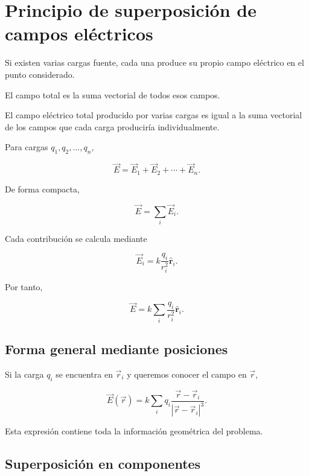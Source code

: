 \section{Principio de superposición de campos eléctricos}

Si existen varias cargas fuente, cada una produce su propio campo eléctrico en el
punto considerado.

El campo total es la suma vectorial de todos esos campos.

\begin{principio}

El campo eléctrico total producido por varias cargas es igual a la suma vectorial
de los campos que cada carga produciría individualmente.

\end{principio}

Para cargas \(q_1,q_2,\ldots,q_n\),

\begin{equation}
\boxed{\vec E=\vec E_1+\vec E_2+\cdots+\vec E_n}.
\end{equation}

De forma compacta,

\begin{equation}
\boxed{\vec E=\sum_i\vec E_i}.
\label{eq:superposicion_campo}
\end{equation}

Cada contribución se calcula mediante

\[
\vec E_i=k\frac{q_i}{r_i^2}\hat{\mathbf r}_i.
\]

Por tanto,

\begin{equation}
\boxed{
\vec E
=
k\sum_i\frac{q_i}{r_i^2}\hat{\mathbf r}_i
}.
\end{equation}


\subsection{Forma general mediante posiciones}

Si la carga \(q_i\) se encuentra en \(\vec r_i\) y queremos conocer el campo en
\(\vec r\),

\[
\boxed{
\vec E(\vec r)
=
k\sum_i
q_i
\frac{\vec r-\vec r_i}{|\vec r-\vec r_i|^3}
}.
\label{eq:campo_superposicion_posiciones}
\]

Esta expresión contiene toda la información geométrica del problema.


\subsection{Superposición en componentes}

